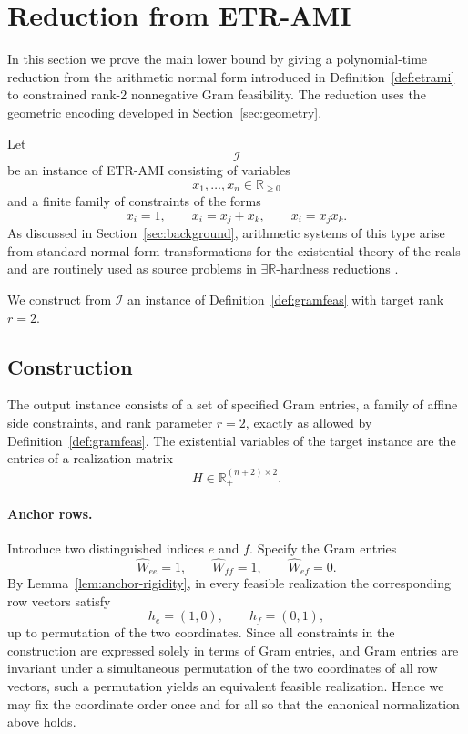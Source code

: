 \documentclass[11pt]{article}
\begin{document}
\section{Reduction from \textsc{ETR-AMI}}
\label{sec:reduction}

In this section we prove the main lower bound by giving a polynomial-time
reduction from the arithmetic normal form introduced in
Definition~\ref{def:etrami} to constrained rank-2 nonnegative Gram feasibility.
The reduction uses the geometric encoding developed in
Section~\ref{sec:geometry}.

Let
\[
\mathcal{I}
\]
be an instance of \textsc{ETR-AMI} consisting of variables
\[
x_1,\dots,x_n \in \mathbb{R}_{\ge 0}
\]
and a finite family of constraints of the forms
\[
x_i = 1,\qquad x_i = x_j + x_k,\qquad x_i = x_j x_k.
\]
As discussed in Section~\ref{sec:background}, arithmetic systems of this type
arise from standard normal-form transformations for the existential theory of
the reals and are routinely used as source problems in
\(\exists\mathbb{R}\)-hardness reductions
\cite{schaefer2010complexity,cardinal2013survey}.

We construct from \(\mathcal{I}\) an instance of
Definition~\ref{def:gramfeas} with target rank \(r=2\).

\subsection{Construction}
\label{subsec:construction}

The output instance consists of a set of specified Gram entries, a family of
affine side constraints, and rank parameter \(r=2\), exactly as allowed by
Definition~\ref{def:gramfeas}. The existential variables of the target
instance are the entries of a realization matrix
\[
H \in \mathbb{R}_+^{(n+2)\times 2}.
\]

\paragraph{Anchor rows.}
Introduce two distinguished indices \(e\) and \(f\). Specify the Gram entries
\[
\widehat{W}_{ee}=1,\qquad \widehat{W}_{ff}=1,\qquad \widehat{W}_{ef}=0.
\]
By Lemma~\ref{lem:anchor-rigidity}, in every feasible realization the
corresponding row vectors satisfy
\[
h_e=(1,0),\qquad h_f=(0,1),
\]
up to permutation of the two coordinates. Since all constraints in the
construction are expressed solely in terms of Gram entries, and Gram entries
are invariant under a simultaneous permutation of the two coordinates of all
row vectors, such a permutation yields an equivalent feasible realization.
Hence we may fix the coordinate order once and for
all so that the canonical normalization above holds.
\end{document}
